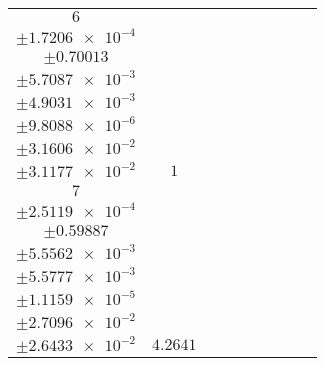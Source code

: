 \documentclass[8pt]{article}
\begin{document}
\begin{longtable}[l]{c c c c c c c c c}
$\num{6}$ & \begin{tabular}[c]{@{}c@{}}$\num{6.3148e-3}$ \\ $\pm\num{1.7206e-4}$\end{tabular} & \begin{tabular}[c]{@{}c@{}}$\num{-3.0221}$ \\ $\pm\num{0.70013}$\end{tabular} & \begin{tabular}[c]{@{}c@{}}$\num{1.5172}$ \\ $\pm\num{5.7087e-3}$\end{tabular} & \begin{tabular}[c]{@{}c@{}}$\num{2.9583e+3}$ \\ $\pm\num{4.9031e-3}$\end{tabular} & \begin{tabular}[c]{@{}c@{}}$\num{5.9182}$ \\ $\pm\num{9.8088e-6}$\end{tabular} & \begin{tabular}[c]{@{}c@{}}$\num{1.7394}$ \\ $\pm\num{3.1606e-2}$\end{tabular} & \begin{tabular}[c]{@{}c@{}}$\num{1.3489}$ \\ $\pm\num{3.1177e-2}$\end{tabular} & $\num{1}$\\
$\num{7}$ & \begin{tabular}[c]{@{}c@{}}$\num{3.1556e-2}$ \\ $\pm\num{2.5119e-4}$\end{tabular} & \begin{tabular}[c]{@{}c@{}}$\num{3.1819}$ \\ $\pm\num{0.59887}$\end{tabular} & \begin{tabular}[c]{@{}c@{}}$\num{5.6326}$ \\ $\pm\num{5.5562e-3}$\end{tabular} & \begin{tabular}[c]{@{}c@{}}$\num{2.9623e+3}$ \\ $\pm\num{5.5777e-3}$\end{tabular} & \begin{tabular}[c]{@{}c@{}}$\num{5.9263}$ \\ $\pm\num{1.1159e-5}$\end{tabular} & \begin{tabular}[c]{@{}c@{}}$\num{3.622}$ \\ $\pm\num{2.7096e-2}$\end{tabular} & \begin{tabular}[c]{@{}c@{}}$\num{3.5614}$ \\ $\pm\num{2.6433e-2}$\end{tabular} & $\num{4.2641}$\\

\end{longtable}
\end{document}
